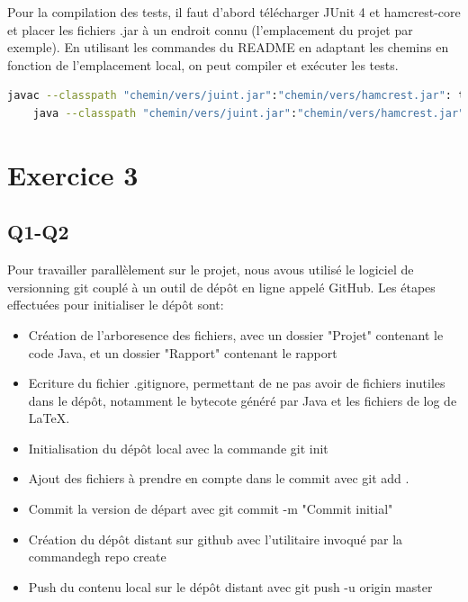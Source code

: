 \documentclass[12pt]{article}
\begin{document}
Pour la compilation des tests, il faut d'abord télécharger JUnit 4 et hamcrest-core et placer les fichiers .jar
à un endroit connu (l'emplacement du projet par exemple). En utilisant les commandes du README en adaptant les 
chemins en fonction de l'emplacement local, on peut compiler et exécuter les tests.

\begin{lstlisting}[language=bash]
    javac --classpath "chemin/vers/juint.jar":"chemin/vers/hamcrest.jar": tests/TestAppliBanque.java
    java --classpath "chemin/vers/juint.jar":"chemin/vers/hamcrest.jar": tests/TestAppliBanque
\end{lstlisting}

\section{Exercice 3}

\subsection{Q1-Q2}

Pour travailler parallèlement sur le projet, nous avous utilisé le logiciel de versionning git couplé à un outil 
de dépôt en ligne appelé GitHub. Les étapes effectuées pour initialiser le dépôt sont:
\begin{itemize}
    \item Création de l'arboresence des fichiers, avec un dossier "Projet" contenant le code Java, et un dossier "Rapport" contenant le rapport
    \item Ecriture du fichier .gitignore, permettant de ne pas avoir de fichiers inutiles dans le dépôt, notamment le bytecote généré par Java et les fichiers de log de \LaTeX.
    \item Initialisation du dépôt local avec la commande \textquotesingle git init\textquotesingle
    \item Ajout des fichiers à prendre en compte dans le commit avec \textquotesingle git add .\textquotesingle 
    \item Commit la version de départ avec \textquotesingle git commit -m "Commit initial"\textquotesingle 
    \item Création du dépôt distant sur github avec l'utilitaire invoqué par la commande\textquotesingle gh repo create\textquotesingle 
    \item Push du contenu local sur le dépôt distant avec \textquotesingle git push -u origin master\textquotesingle 
\end{itemize}
\end{document}
